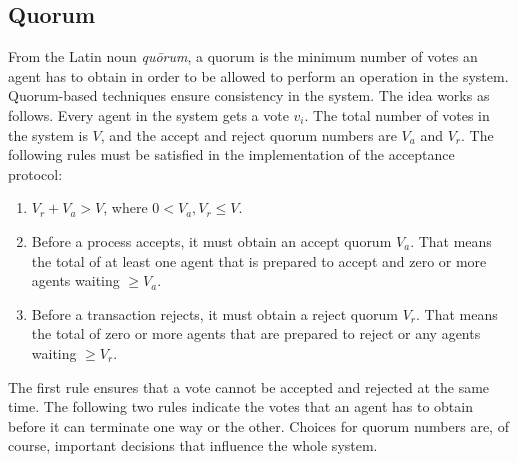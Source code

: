 \subsection{Quorum}
From the Latin noun \textit{qu\=orum}, a quorum is the minimum number of votes an agent has to obtain in order to be allowed to perform an operation in the system. Quorum-based techniques ensure consistency in the system.  The idea works as follows. Every agent in the system gets a vote $v_{i}$. The total number of votes in the system is $V$, and the accept and reject quorum numbers are $V_{a}$ and $V_{r}$. The following rules must be satisfied in the implementation of the acceptance protocol:
\begin{enumerate}
	\item $V_{r} + V_{a} > V$, where $0 < V_{a}, V_{r} \leq  V$.
	\item Before a process accepts, it must obtain an accept quorum $V_{a}$. That means the total of at least one agent that is prepared to accept and zero or more agents waiting $\geq V_{a}$.
	\item Before a transaction rejects, it must obtain a reject quorum $V_{r}$. That means the total of zero or more agents that are prepared to reject or any agents waiting $\geq  V_{r}$.
\end{enumerate}
The first rule ensures that a vote cannot be accepted and rejected at the same time. The following two rules indicate the votes that an agent has to obtain before it can terminate one way or the other. Choices for quorum numbers are, of course, important decisions that influence the whole system.~\cite{Ozsu1999}
